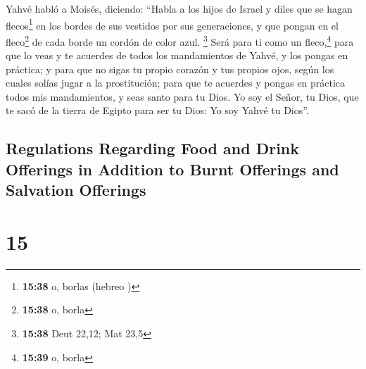 \begin{paracol}{2}
 Yahvé habló a Moisés, diciendo:  ``Habla
a los hijos de Israel y diles que se hagan flecos\footnote{\textbf{15:38}
  o, borlas (hebreo )} en los bordes de sus vestidos por
sus generaciones, y que pongan en el fleco\footnote{\textbf{15:38} o,
  borla} de cada borde un cordón de color azul. \footnote{\textbf{15:38}
  Deut 22,12; Mat 23,5}  Será para ti como un
fleco,\footnote{\textbf{15:39} o, borla} para que lo veas y te acuerdes
de todos los mandamientos de Yahvé, y los pongas en práctica; y para que
no sigas tu propio corazón y tus propios ojos, según los cuales solías
jugar a la prostitución;  para que te acuerdes y pongas
en práctica todos mis mandamientos, y seas santo para tu Dios.
 Yo soy el Señor, tu Dios, que te sacó de la tierra de
Egipto para ser tu Dios: Yo soy Yahvé tu Dios''.

\switchcolumn
\begin{otherlanguage}{english}

\hypertarget{regulations-regarding-food-and-drink-offerings-in-addition-to-burnt-offerings-and-salvation-offerings}{%
\subsection{Regulations Regarding Food and Drink Offerings in Addition
to Burnt Offerings and Salvation
Offerings}\label{regulations-regarding-food-and-drink-offerings-in-addition-to-burnt-offerings-and-salvation-offerings}}

\hypertarget{section-29}{%
\section{15}\label{section-29}}


\end{otherlanguage}
\end{paracol}
